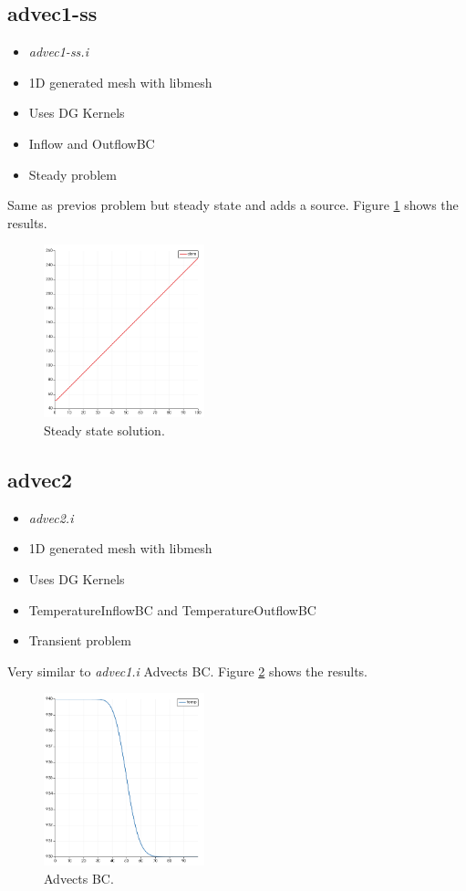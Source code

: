 \documentclass[11pt,letterpaper]{article}
\begin{document}
	\subsection{advec1-ss}

	\begin{itemize}
		\item \textit{advec1-ss.i}
		\item 1D generated mesh with libmesh
		\item Uses DG Kernels
		\item Inflow and OutflowBC
		\item Steady problem
	\end{itemize}

    Same as previos problem but steady state and adds a source.
    Figure \ref{fig:advec1-ss} shows the results.

	\begin{figure}[htbp!]
		\centering
		\includegraphics[height=5cm]{advec1-ss}
		\caption{Steady state solution.}
		\label{fig:advec1-ss}
	\end{figure}

	\subsection{advec2}

	\begin{itemize}
		\item \textit{advec2.i}
		\item 1D generated mesh with libmesh
		\item Uses DG Kernels
		\item TemperatureInflowBC and TemperatureOutflowBC
		\item Transient problem
	\end{itemize}

    Very similar to \textit{advec1.i}
    Advects BC.
    Figure \ref{fig:advec2} shows the results.

	\begin{figure}[htbp!]
		\centering
		\includegraphics[height=5cm]{advec2}
		\caption{Advects BC.}
		\label{fig:advec2}
	\end{figure}
\end{document}
